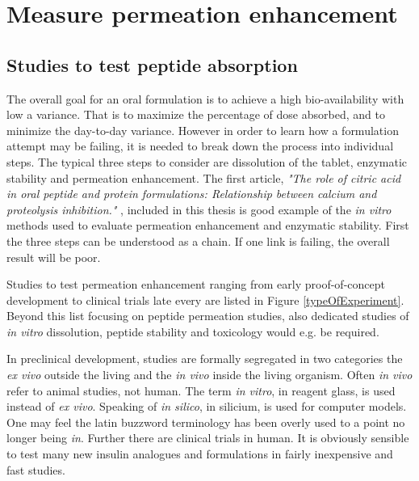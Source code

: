 \chapter{Measure permeation enhancement}


\section{Studies to test peptide absorption}
The overall goal for an oral formulation is to achieve a high bio-availability with low a variance. That is to maximize the percentage of dose absorbed, and to minimize the day-to-day variance. However in order to learn how a formulation attempt may be failing, it is needed to break down the process into individual steps. The typical three steps to consider are dissolution of the tablet, enzymatic stability and permeation enhancement. The first article, \textit{"The role of citric acid in oral peptide and protein formulations: Relationship between calcium and proteolysis inhibition."} \cite{welling2014citric}, included in this thesis is good example of the \textit{in vitro} methods used to evaluate permeation enhancement and enzymatic stability. First the three steps can be understood as a chain. If one link is failing, the overall result will be poor.

Studies to test permeation enhancement ranging from early proof-of-concept development to clinical trials late every are listed in Figure \ref{typeOfExperiment}. Beyond this list focusing on peptide permeation studies, also dedicated studies of \textit{in vitro} dissolution, peptide stability and toxicology would e.g. be required.

In preclinical development, studies are formally segregated in two categories the \textit{ex vivo} outside the living and the \textit{in vivo} inside the living organism. Often \textit{in vivo} refer to animal studies, not human. The term \textit{in vitro}, in reagent glass, is used instead of \textit{ex vivo}. Speaking of \textit{in silico}, in silicium, is used for computer models. One may feel the latin buzzword terminology has been overly used to a point no longer being \textit{in}. Further there are clinical trials in human. It is obviously sensible to test many new insulin analogues and formulations in fairly inexpensive and fast studies.

